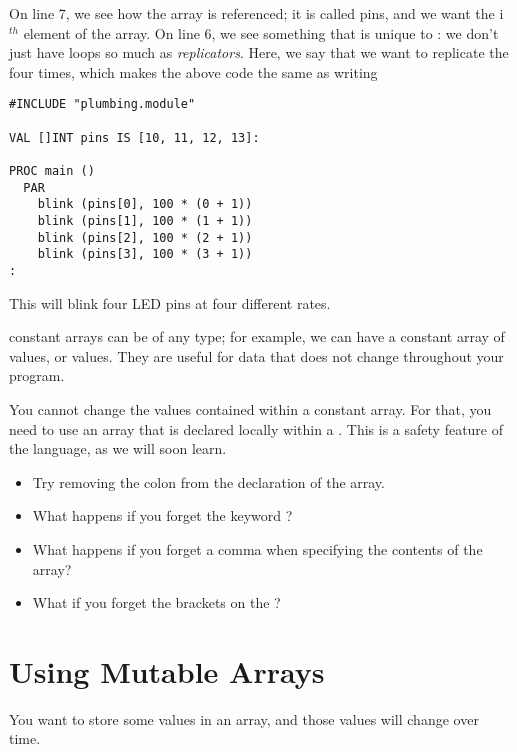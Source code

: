 On line 7, we see how the array is referenced; it is called {\code pins}, and we want the {\code i}$^{th}$ element of the array. On line 6, we see something that is unique to \occam: we don't just have loops so much as \emph{replicators}. Here, we say that we want to replicate the \PAR four times, which makes the above code the same as writing

\begin{lstlisting}
#INCLUDE "plumbing.module"

VAL []INT pins IS [10, 11, 12, 13]:

PROC main ()
  PAR
    blink (pins[0], 100 * (0 + 1))
    blink (pins[1], 100 * (1 + 1))
    blink (pins[2], 100 * (2 + 1))
    blink (pins[3], 100 * (3 + 1))
:
\end{lstlisting}

This will blink four LED pins at four different rates.

\discussion

\occam constant arrays can be of any type; for example, we can have a constant array of \BOOL values, or \REALTT values. They are useful for data that does not change throughout your program. 

You cannot change the values contained within a constant array. For that, you need to use an array that is declared locally within a \PROC. This is a safety feature of the language, as we will soon learn.

\makingthingsbreak

\begin{itemize}
	\item Try removing the colon from the declaration of the array.
	\item What happens if you forget the keyword \VAL?
	\item What happens if you forget a comma when specifying the contents of the array?
	\item What if you forget the brackets on the {\code []\INT}?
\end{itemize}

\seealso

\XXX

% 
\section{Using Mutable Arrays}
\problem
You want to store some values in an array, and those values will change over time.

